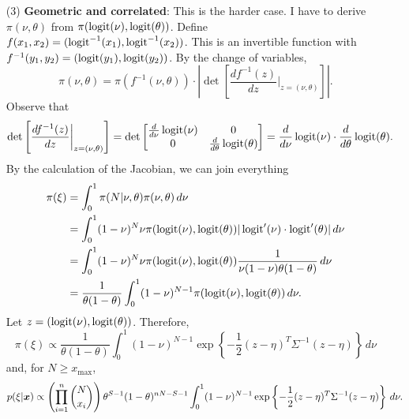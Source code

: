 {{\begin{enumerate}
    \item[(3)]  {\bf Geometric and correlated}: This is the harder case. I
    have to derive $\pi(\nu,\theta)$ from $\pi(\operatorname{logit}(\nu), \operatorname{logit}(\theta))$.
    Define $f(x_1,x_2) = (\operatorname{logit}^{-1}(x_1), \operatorname{logit}^{-1}(x_2))$. This is an
    invertible function with $f^{-1}(y_1,y_2) = (\operatorname{logit}(y_1), \operatorname{logit}(y_2))$. By
    the change of variables, 
    $$
    \pi(\nu,\theta) = \pi(f^{-1}(\nu, \theta))\cdot\left|\det \left[\frac{df^{-1}(z)}{dz}\bigg|_{z=(\nu,\theta)}\right]\right|.
    $$
    Observe that 
    $$
    \det \left[\frac{df^{-1}(z)}{dz}\bigg|_{z=(\nu,\theta)}\right] = \det \begin{bmatrix}
        \frac{d}{d\nu}\operatorname{logit}(\nu) & 0 \\
        0 & \frac{d}{d\theta}\operatorname{logit}(\theta)
    \end{bmatrix} = \frac{d}{d\nu}\operatorname{logit}(\nu) \cdot \frac{d}{d\theta}\operatorname{logit}(\theta).
    $$
    By the calculation of the Jacobian, we can join everything
    \begin{equation*}
        \begin{split}
            \pi(\xi) &= \int_0^{1} \pi(N|\nu,\theta)\pi(\nu,\theta) \, d\nu  \\
            &= \int_0^1 (1-\nu)^N\nu \pi(\operatorname{logit}(\nu), \operatorname{logit}(\theta))|\operatorname{logit} '(\nu) \cdot \operatorname{logit} '(\theta)| \, d\nu \\
            &= \int_0^1 (1-\nu)^N\nu \pi(\operatorname{logit}(\nu), \operatorname{logit}(\theta))\frac{1}{\nu(1-\nu)\theta(1-\theta)}\, d\nu \\ 
            &= \frac{1}{\theta(1-\theta)}\int_0^1 (1-\nu)^{N-1}\pi(\operatorname{logit}(\nu), \operatorname{logit}(\theta)) \, d\nu . \\
        \end{split}
    \end{equation*} 
    Let $z = (\operatorname{logit}(\nu), \operatorname{logit}(\theta))$. Therefore, 
    \begin{equation}
        \label{eq:prior-geom-corr}
        \pi(\xi) \propto \frac{1}{\theta(1-\theta)}\int_0^1 (1-\nu)^{N-1}\exp\left\{-\frac{1}{2}(z - \eta)^T\Sigma^{-1}(z-\eta)\right\} \, d\nu
    \end{equation}
    and, for $N \ge x_{\max}$, 
    \begin{equation}
        \label{eq:posterior-geom-corr}
        p(\xi|\boldsymbol{x}) \propto \left(\prod_{i=1}^n \binom{N}{x_i}\right)\theta^{S-1}(1 - \theta)^{nN - S-1}\int_0^1 (1-\nu)^{N-1}\exp\left\{-\frac{1}{2}(z - \eta)^T\Sigma^{-1}(z-\eta)\right\} \, d\nu.
    \end{equation}

\end{enumerate}

}}


\vspace{2ex}
